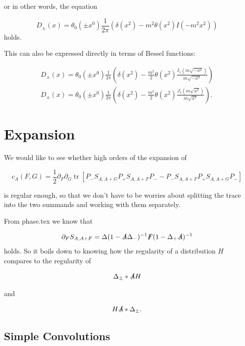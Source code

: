 \documentclass[a4paper,11pt]{article}
\DeclareMathOperator{\tr}{tr}
\begin{document}
or in other words, the equation

\begin{equation}
D_\pm (x)= \theta_0(\pm x^0)\frac{1 }{2\pi} \left( \delta(x^2)-m^2 \theta(x^2) I(-m^2x^2)\right)
\end{equation}
holds.

This can also be expressed directly in terms of Bessel functions:

\begin{align}
D_\pm (x)= \theta_0(\pm x^0)\frac{1 }{2\pi} \left( \delta(x^2)-\frac{m^2}{2} \theta(x^2) \frac{I_1(m\sqrt{-x^2})}{m\sqrt{-x^2}}\right)\\
D_\pm (x)= \theta_0(\pm x^0)\frac{1 }{2\pi} \left( \delta(x^2)-\frac{m^2}{2} \theta(x^2) \frac{J_1(m\sqrt{x^2})}{m\sqrt{x^2}}\right).
\end{align}


\section{Expansion}
We would like to see whether high orders of the expansion of 


\begin{equation}\label{trace}
c_A(F,G)=\frac{1}{2} \partial_F \partial_G \tr \left[ P_- S_{A,A+G} P_+ S_{A,A+F} P_- - P_- S_{A,A+F} P_+ S_{A,A+G} P_- \right]
\end{equation}

is regular enough, so that we don't have to be worries about splitting the trace into the two summands and working with them separately.

From phase.tex we know that

\begin{equation}\label{SSeries}
\partial_F S_{A,A+F}= \Delta (1-\slashed{A}\Delta_-)^{-1} \slashed{F} ( 1-\Delta_+ \slashed{A})^{-1}
\end{equation}
holds. So it boils down to knowing how the regularity of a distribution \(H\) compares to the regularity of

\begin{equation}
\Delta_{\pm} * \slashed{A} H
\end{equation}

and 

\begin{equation}
 H \slashed{A} * \Delta_{\pm}.
\end{equation}

\subsection{Simple Convolutions}
\end{document}
